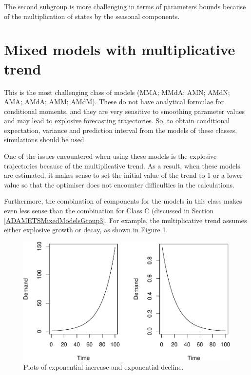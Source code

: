 \documentclass[
]{book}
\theoremstyle{definition}
\theoremstyle{definition}
\theoremstyle{definition}
\theoremstyle{definition}
\theoremstyle{remark}
\begin{document}
The second subgroup is more challenging in terms of parameters bounds because of the multiplication of states by the seasonal components.

\hypertarget{ADAMETSMixedModelsGroup4}{%
\section{Mixed models with multiplicative trend}\label{ADAMETSMixedModelsGroup4}}

This is the most challenging class of models (MMA; MMdA; AMN; AMdN; AMA; AMdA; AMM; AMdM). These do not have analytical formulae for conditional moments, and they are very sensitive to smoothing parameter values and may lead to explosive forecasting trajectories. So, to obtain conditional expectation, variance and prediction interval from the models of these classes, simulations should be used.

One of the issues encountered when using these models is the explosive trajectories because of the multiplicative trend. As a result, when these models are estimated, it makes sense to set the initial value of the trend to 1 or a lower value so that the optimiser does not encounter difficulties in the calculations.

Furthermore, the combination of components for the models in this class makes even less sense than the combination for Class C (discussed in Section \ref{ADAMETSMixedModelsGroup3}. For example, the multiplicative trend assumes either explosive growth or decay, as shown in Figure \ref{fig:plotsOfExponent}.

\begin{figure}
\centering
\includegraphics{Svetunkov--2022----ADAM_files/figure-latex/plotsOfExponent-1.pdf}
\caption{\label{fig:plotsOfExponent}Plots of exponential increase and exponential decline.}
\end{figure}
\end{document}
